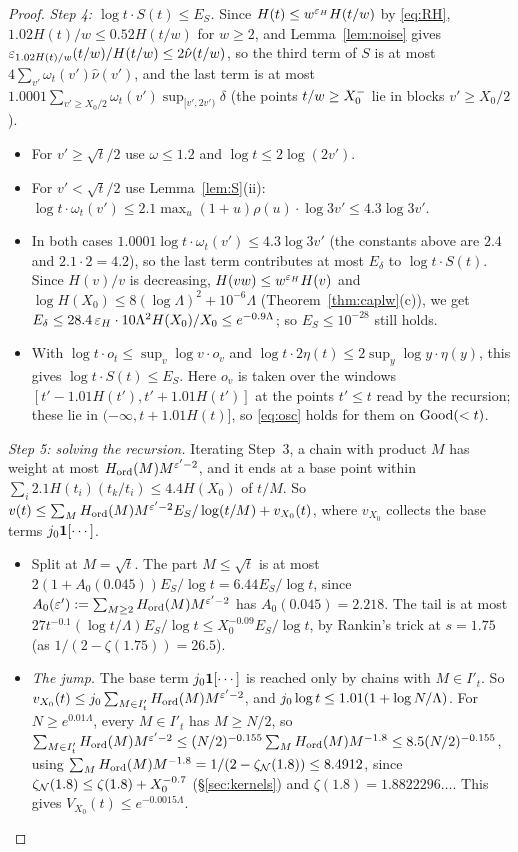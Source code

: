 \begin{proof}
\emph{Step 4: $\log t\cdot S(t)\le E_S$.} Since $H(t)\le w^{\varepsilon_H}H(t/w)$ by \eqref{eq:RH}, $1.02H(t)/w\le0.52H(t/w)$ for
$w\ge2$, and Lemma~\ref{lem:noise} gives
$\varepsilon_{1.02H(t)/w}(t/w)/H(t/w)\le2\hat\nu(t/w)$, so the third term of $S$ is at most $4\sum_{v'}\omega_t(v')\hat\nu(v')$, and the
last term is at most $1.0001\sum_{v'\ge X_0/2}\omega_t(v')\sup_{[v',2v')}\delta$ (the points $t/w\ge X_0^{-}$ lie in blocks $v'\ge X_0/2$).
\begin{itemize}
\item For $v'\ge\sqrt t/2$ use $\omega\le1.2$ and $\log t\le2\log(2v')$.
\item For $v'<\sqrt t/2$ use Lemma~\ref{lem:S}(ii): $\log t\cdot\omega_t(v')\le2.1\max_u(1+u)\rho(u)\cdot\log3v'\le4.3\log3v'$.
\item In both cases $1.0001\log t\cdot\omega_t(v')\le4.3\log3v'$ (the constants above are $2.4$ and $2.1\cdot2=4.2$), so the last
  term contributes at most $E_\delta$ to $\log t\cdot S(t)$.
  Since $H(v)/v$ is decreasing, $H(vw)\le w^{\varepsilon_H}H(v)$ and $\log H(X_0)\le8(\log\Lambda)^2+10^{-6}\Lambda$
  (Theorem~\ref{thm:caplw}(c)), we get $E_\delta\le28.4\,\varepsilon_H\cdot10\Lambda^2H(X_0)/X_0\le e^{-0.9\Lambda}$; so $E_S\le10^{-28}$ still holds.
\item With $\log t\cdot o_t\le\sup_v\log v\cdot o_v$ and $\log t\cdot2\eta(t)\le2\sup_y\log y\cdot\eta(y)$, this gives
  $\log t\cdot S(t)\le E_S$. Here $o_v$ is taken over the windows $[t'-1.01H(t'),t'+1.01H(t')]$ at the points $t'\le t$ read by
  the recursion; these lie in $(-\infty,t+1.01H(t)]$, so \eqref{eq:osc} holds for them on $\mathrm{Good}(<t)$.
\end{itemize}

\emph{Step 5: solving the recursion.} Iterating Step~3, a chain with product $M$ has weight at most $H_{\mathrm{ord}}(M)M^{\varepsilon'-2}$, and
it ends at a base point within $\sum_i2.1H(t_i)(t_k/t_i)\le4.4H(X_0)$ of $t/M$. So
$v(t)\le\sum_MH_{\mathrm{ord}}(M)M^{\varepsilon'-2}E_S/\log(t/M)+v_{X_0}(t)$, where $v_{X_0}$ collects the base terms
$j_0\mathbf 1[\cdots]$.
\begin{itemize}
\item Split at $M=\sqrt t$. The part $M\le\sqrt t$ is at most $2(1+A_0(0.045))E_S/\log t=6.44E_S/\log t$, since
  $A_0(\varepsilon'):=\sum_{M\ge2}H_{\mathrm{ord}}(M)M^{\varepsilon'-2}$ has $A_0(0.045)=2.218$. The tail is at most
  $27t^{-0.1}(\log t/\Lambda)E_S/\log t\le X_0^{-0.09}E_S/\log t$, by Rankin's trick at $s=1.75$ (as $1/(2-\zeta(1.75))=26.5$).
\item \emph{The jump.} The base term $j_0\mathbf 1[\cdots]$ is reached only by chains with $M\in I'_t$. So
  $v_{X_0}(t)\le j_0\sum_{M\in I'_t}H_{\mathrm{ord}}(M)M^{\varepsilon'-2}$, and $j_0\log t\le1.01(1+\log N/\Lambda)$. For $N\ge e^{0.01\Lambda}$, every
  $M\in I'_t$ has $M\ge N/2$, so
  $\sum_{M\in I'_t}H_{\mathrm{ord}}(M)M^{\varepsilon'-2}\le(N/2)^{-0.155}\sum_MH_{\mathrm{ord}}(M)M^{-1.8}\le8.5(N/2)^{-0.155}$, using
  $\sum_MH_{\mathrm{ord}}(M)M^{-1.8}=1/(2-\zeta_{\mathcal{N}}(1.8))\le8.4912$, since $\zeta_{\mathcal{N}}(1.8)\le\zeta(1.8)+X_0^{-0.7}$
  (\S\ref{sec:kernels}) and $\zeta(1.8)=1.8822296\ldots$. This gives $V_{X_0}(t)\le e^{-0.0015\Lambda}$.
\end{itemize}


\end{proof}
